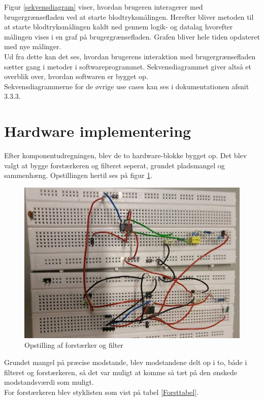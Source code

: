 Figur \ref{sekvensdiagram} viser, hvordan brugeren interagerer med brugergrænsefladen ved at starte blodtryksmålingen. Herefter bliver metoden til at starte blodtryksmålingen kaldt ned gennem logik- og datalag hvorefter målingen vises i en graf på brugergrænsefladen. Grafen bliver hele tiden opdateret med nye målinger.\\
Ud fra dette kan det ses, hvordan brugerens interaktion med brugergrænsefladen sætter gang i metoder i softwareprogrammet. Sekvensdiagrammet giver altså et overblik over, hvordan softwaren er bygget op.\\
Sekvensdiagrammerne for de øvrige use cases kan ses i dokumentationen afsnit 3.3.3.
  

\section{Hardware implementering}
\label{himpl}
Efter komponentudregningen, blev de to hardware-blokke bygget op. Det blev valgt at bygge forstærkeren og filteret seperat, grundet pladsmangel og sammenhæng. Opstillingen hertil ses på figur \ref{samletopbygning}.\\

\begin{figure}[H]
	\centering
	\includegraphics[width=1\textwidth]{Figurer/Hardware/samletopstilling}
	\caption{Opstilling af forstærker og filter}
	\label{samletopbygning}
\end{figure}

Grundet mangel på præcise modstande, blev modstandene delt op i to, både i filteret og forstærkeren, så det var muligt at komme så tæt på den ønskede modstandsværdi som muligt. \\
For forstærkeren blev styklisten som vist på tabel \ref{Forsttabel}.



